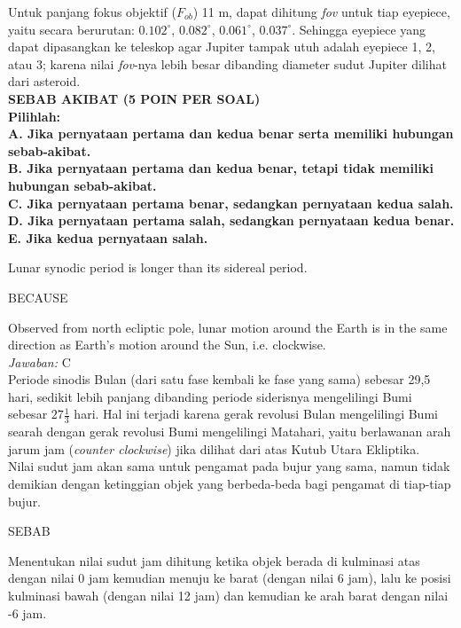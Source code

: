 \documentclass[11pt,fleqn]{exam}
\begin{document}
\begin{questions}
Untuk panjang fokus objektif ($F_{ob}$) 11 m, dapat dihitung \textit{fov} untuk tiap eyepiece, yaitu secara berurutan: $0.102^{\circ}$, $0.082^{\circ}$, $0.061^{\circ}$, $0.037^{\circ}$. Sehingga eyepiece yang dapat dipasangkan ke teleskop agar Jupiter tampak utuh adalah eyepiece 1, 2, atau 3; karena nilai \textit{fov}-nya lebih besar dibanding diameter sudut Jupiter dilihat dari asteroid.\\




\vspace{0.5cm}
\textbf{SEBAB AKIBAT (5 POIN PER SOAL)\\
Pilihlah:\\
A. Jika pernyataan pertama dan kedua benar serta memiliki hubungan sebab-akibat.\\
B. Jika pernyataan pertama dan kedua benar, tetapi tidak memiliki hubungan sebab-akibat.\\
C. Jika pernyataan pertama benar, sedangkan pernyataan kedua salah.\\
D. Jika pernyataan pertama salah, sedangkan pernyataan kedua benar.\\
E. Jika kedua pernyataan salah.\\
}

\question Lunar synodic period is longer than its sidereal period.
\begin{center}
BECAUSE
\end{center}
Observed from north ecliptic pole, lunar motion around the Earth is in the same direction as Earth's motion around the Sun, i.e. clockwise.\\

\textit{Jawaban: } C\\

Periode sinodis Bulan (dari satu fase kembali ke fase yang sama) sebesar 29,5 hari, sedikit lebih panjang dibanding periode siderisnya mengelilingi Bumi sebesar $27\frac{1}{3}$ hari. Hal ini terjadi karena gerak revolusi Bulan mengelilingi Bumi searah dengan gerak revolusi Bumi mengelilingi Matahari, yaitu berlawanan arah jarum jam (\textit{counter clockwise}) jika dilihat dari atas Kutub Utara Ekliptika.\\


\question Nilai sudut jam akan sama untuk pengamat pada bujur yang sama, namun tidak demikian dengan ketinggian objek yang berbeda-beda bagi pengamat di tiap-tiap bujur.
\begin{center}
SEBAB
\end{center}
Menentukan nilai sudut jam dihitung ketika objek berada di kulminasi atas dengan nilai 0 jam kemudian menuju ke barat (dengan nilai 6 jam), lalu ke posisi kulminasi bawah (dengan nilai 12 jam) dan kemudian ke arah barat dengan nilai -6 jam.\\


\end{questions}
\end{document}
